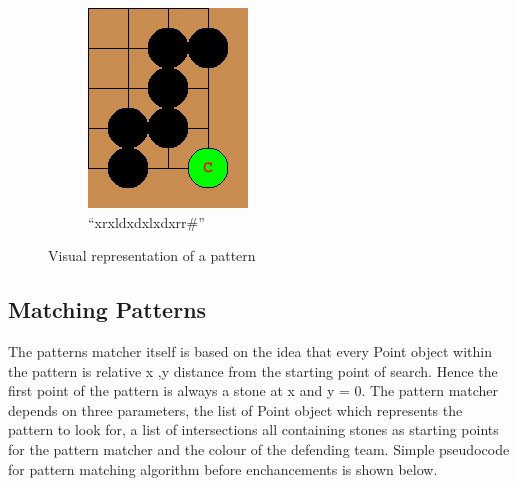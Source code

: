 \documentclass{l4proj}
\begin{document}
\begin{figure}[!ht]
\centering
\begin{subfigure}[b]{0.2\textwidth}
\includegraphics[width=\textwidth]{pat/1.png}
\caption{“xrxldxdxlxdxrr\#”}
\label{fig:pat-1a}
\end{subfigure}
\caption{Visual representation of a pattern}
\label{fig:pat-1}
\end{figure}

\subsection{Matching Patterns}

The patterns matcher itself is based on the idea that every Point object within the pattern is relative x ,y distance from the starting point of search. Hence the first point of the pattern is always a stone at x and y = 0. The pattern matcher depends on three parameters, the list of Point object which represents the pattern to look for, a list of intersections all containing stones as starting points for the pattern matcher and the colour of the defending team. Simple pseudocode for pattern matching algorithm before enchancements is shown below.
\end{document}
